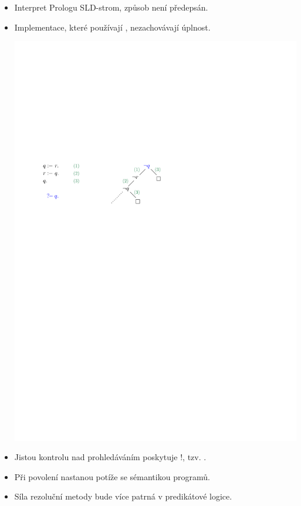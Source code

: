 \begin{itemize}
\item Interpret Prologu  SLD-strom, způsob není předepsán.

\item Implementace, které používají , nezachovávají úplnost.

\smallskip
\centerline{\includegraphics[scale=0.9]{files/rezoluceneuplnost.pdf}}
\smallskip

\item Jistou kontrolu nad prohledáváním poskytuje !, tzv. .

\item Při povolení  nastanou potíže se sémantikou programů.

\item Síla rezoluční metody bude více patrná v predikátové logice.
\end{itemize}

